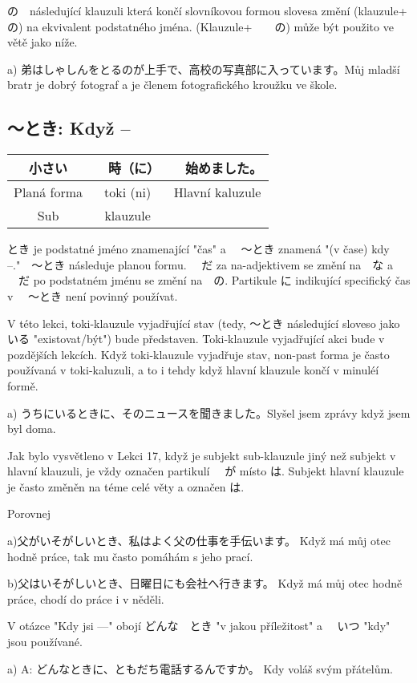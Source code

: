 の　následující klauzuli která končí slovníkovou formou slovesa změní (klauzule+　の) na ekvivalent podstatného jména. (Klauzule+　　の) může být použito ve větě jako níže.　

a) 弟はしゃしんをとるのが上手で、高校の写真部に入っています。Můj mladší bratr je dobrý fotograf a je členem fotografického kroužku ve škole.



\subsection{〜とき: Když --}
\begin{tabular}{||c|c||c||}
\hline
小さい　&　時（に）&　始めました。\\
\hline
Planá forma & toki (ni)& Hlavní kaluzule\\
Sub& klauzule&\\
\hline
\end{tabular}

とき je podstatné jméno znamenající "čas" a 　〜とき znamená "(v čase) kdy --."　〜とき následuje planou formu. 　だ za na-adjektivem se změní na　な a 　だ po podstatném jménu se změní na　の. Partikule に indikující specifický čas  v 　〜とき není povinný používat.

V této lekci, toki-klauzule vyjadřující stav (tedy, 〜とき následující sloveso jako　いる "existovat/být") bude představen. Toki-klauzule vyjadřující akci bude v pozdějších lekcích. Když toki-klauzule vyjadřuje stav, non-past forma je často používaná v toki-kaluzuli, a to i tehdy když hlavní klauzule končí v minuléí formě.

a) うちにいるときに、そのニュースを聞きました。Slyšel jsem zprávy když jsem byl doma.

Jak bylo vysvětleno v Lekci 17, když je subjekt sub-klauzule jiný než subjekt v hlavní klauzuli, je vždy označen partikulí 　が	místo 	は. Subjekt hlavní klauzule je často změněn na téme celé věty a označen 	は.

Porovnej 

a)父がいそがしいとき、私はよく父の仕事を手伝います。 Když má můj otec hodně práce, tak mu často pomáhám s jeho prací.

b)父はいそがしいとき、日曜日にも会社へ行きます。 Když má můj otec hodně práce, chodí do práce i v něděli.


V otázce "Kdy jsi ---" obojí	どんな　とき	"v jakou příležitost" a 　いつ	"kdy" jsou používané.

a) A: 	どんなときに、ともだち電話するんですか。	Kdy voláš svým přátelům.


